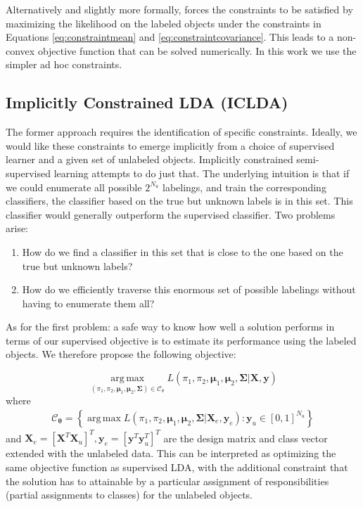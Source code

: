 \documentclass[10pt, a4paper, conference]{IEEEtran}
\begin{document}
Alternatively and slightly more formally, \cite{Loog2012b} forces the constraints to be satisfied by maximizing the likelihood on the labeled objects under the constraints in Equations \eqref{eq:constraintmean} and \eqref{eq:constraintcovariance}. This leads to a non-convex objective function that can be solved numerically. In this work we use the simpler ad hoc constraints.

\subsection{Implicitly Constrained LDA (ICLDA)}
The former approach requires the identification of specific constraints. Ideally, we would like these constraints to emerge implicitly from a choice of supervised learner and a given set of unlabeled objects. Implicitly constrained semi-supervised learning attempts to do just that. The underlying intuition is that if we could enumerate all possible $2^{N_u}$ labelings, and train the corresponding classifiers, the classifier based on the true but unknown labels is in this set. This classifier would generally outperform the supervised classifier. Two problems arise:

\begin{enumerate}
\item How do we find a classifier in this set that is close to the one based on the true but unknown labels?
\item How do we efficiently traverse this enormous set of possible labelings without having to enumerate them all?
\end{enumerate}
As for the first problem: a safe way to know how well a solution performs in terms of our supervised objective is to estimate its performance using the labeled objects. We therefore propose the following objective:

\begin{equation}
\label{eq:iclda}
\operatorname*{arg\,max}_{\left( \pi_1,\pi_2, \boldsymbol{\mu}_1,\boldsymbol{\mu}_2,\mathbf{\Sigma}\right) \in \mathcal{C}_\theta} L(\pi_1,\pi_2, \boldsymbol{\mu}_1,\boldsymbol{\mu}_2,\mathbf{\Sigma}|\mathbf{X},\mathbf{y})
\end{equation}
where
\begin{align}
\mathcal{C}_{\boldsymbol{\theta}} = \left\{ \operatorname*{arg\,max} L(\pi_1,\pi_2, \boldsymbol{\mu}_1,\boldsymbol{\mu}_2,\mathbf{\Sigma}| \mathbf{X}_e, \mathbf{y}_e) : \mathbf{y}_u \in [0,1]^{N_u} \right\} \nonumber
\end{align}
and $\mathbf{X}_e=[\mathbf{X}^T \mathbf{X}_u]^T, \mathbf{y}_e=[\mathbf{y}^T \mathbf{y}_u^T]^T$ are the design matrix and class vector extended with the unlabeled data. This can be interpreted as optimizing the same objective function as supervised LDA, with the additional constraint that the solution has to attainable by a particular assignment of responsibilities (partial assignments to classes) for the unlabeled objects.
\end{document}
